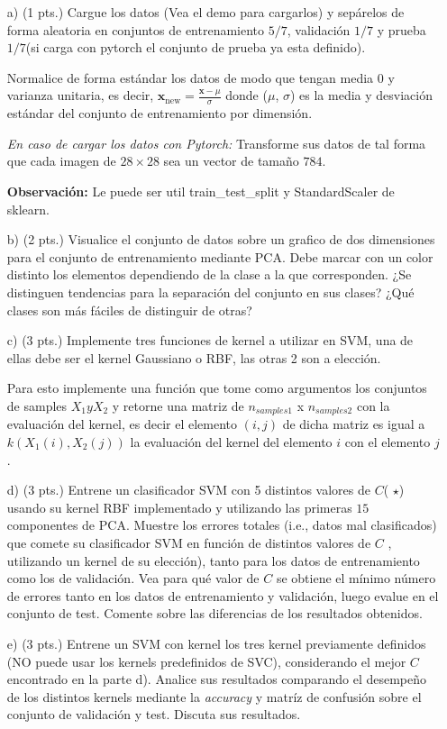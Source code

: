 \documentclass[11pt,letterpaper]{article}
\newcommand{\x}{\ensuremath{\mathbf{x}}}
\begin{document}
\begin{enumerate}

\item[a)](1 pts.) Cargue los datos (Vea el demo para cargarlos) y sepárelos de forma aleatoria en conjuntos de entrenamiento $5/7$, validación $1/7$ y prueba $1/7$(si carga con pytorch el conjunto de prueba ya esta definido).

Normalice de forma estándar los datos de modo que tengan media $0$ y varianza unitaria, es decir, $\x_{\text{new}} = \frac{\x - \mu}{\sigma}$ donde ($\mu$, $\sigma$) es la media y desviación estándar del conjunto de entrenamiento por dimensión.

\textit{En caso de cargar los datos con Pytorch:} Transforme sus datos de tal forma que cada imagen de $28 \times 28$ sea un vector de tamaño $784$.

\textbf{Observación:} Le puede ser util train\_test\_split y StandardScaler de sklearn.

\item [b) ](2 pts.) Visualice el conjunto de datos sobre un grafico de dos dimensiones para el conjunto de entrenamiento mediante PCA. Debe marcar con un color distinto los elementos dependiendo de la clase a la que corresponden. ¿Se distinguen tendencias para la separación del conjunto en sus clases? ¿Qué clases son más fáciles de distinguir de otras?

\item[c) ](3 pts.) Implemente tres funciones de kernel a utilizar en SVM, una de ellas debe ser el kernel Gaussiano o RBF, las otras 2 son a elección.

Para esto implemente una función que tome como argumentos los conjuntos de samples $X_1 y X_2$ y retorne una matriz de $n_{samples 1}$ x $n_{samples 2}$ con la evaluación del kernel, es decir el elemento $(i, j)$ de dicha matriz es igual a $k(X_1(i), X_2(j))$ la evaluación del kernel del elemento $i$ con el elemento $j$.


\item[d) ](3 pts.) Entrene un clasificador SVM con 5 distintos valores de $C$( $\star$) usando su kernel RBF implementado y utilizando las primeras $15$ componentes de PCA. Muestre los errores totales (i.e., datos mal clasificados) que comete su clasificador SVM en función de distintos valores de $C$ , utilizando un kernel de su elección), tanto para los datos de entrenamiento como los de validación. Vea para qué valor de $C$ se obtiene el mínimo número de errores tanto en los datos de entrenamiento y validación, luego evalue en el conjunto de test. Comente sobre las diferencias de los resultados obtenidos.

\item[e) ](3 pts.) Entrene un SVM con kernel los tres kernel previamente definidos (NO puede usar los kernels predefinidos de SVC), considerando el mejor $C$ encontrado en la parte d). Analice sus resultados comparando el desempeño de los distintos kernels mediante la \textit{accuracy} y matríz de confusión sobre el conjunto de validación y test. Discuta sus resultados.

\end{enumerate}
\end{document}
